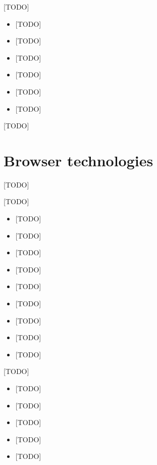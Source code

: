 \documentclass[a4paper,12pt,oneside]{sphinxmanual}
\begin{document}
{[}TODO{]}
\begin{itemize}
\item {} 
{[}TODO{]}

\item {} 
{[}TODO{]}

\item {} 
{[}TODO{]}

\item {} 
{[}TODO{]}

\item {} 
{[}TODO{]}

\item {} 
{[}TODO{]}

\end{itemize}

{[}TODO{]}

\index{{[}TODO{]}}\index{{[}TODO{]}}

\section{Browser technologies}
\label{about:id10}\label{about:index-8}\label{about:about-browser-tech}
{[}TODO{]}

{[}TODO{]}
\begin{itemize}
\item {} 
{[}TODO{]}

\item {} 
{[}TODO{]}

\item {} 
{[}TODO{]}

\item {} 
{[}TODO{]}

\item {} 
{[}TODO{]}

\item {} 
{[}TODO{]}

\item {} 
{[}TODO{]}

\item {} 
{[}TODO{]}

\item {} 
{[}TODO{]}

\end{itemize}

{[}TODO{]}
\begin{itemize}
\item {} 
{[}TODO{]}

\item {} 
{[}TODO{]}

\item {} 
{[}TODO{]}

\item {} 
{[}TODO{]}

\item {} 
{[}TODO{]}

\end{itemize}
\end{document}
